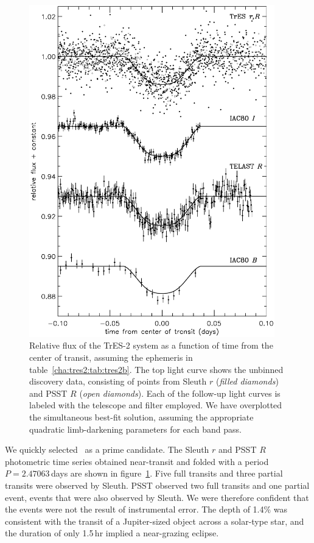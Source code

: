 \begin{figure}
\begin{center}
\includegraphics[width=0.95\textwidth]{4_f1}
\caption[Relative flux versus time for the TrES-2 transiting system]{Relative flux of the TrES-2 system as a function of time
  from the center of transit, assuming the ephemeris in
  table~\ref{cha:tres2:tab:tres2b}. The top light curve shows the unbinned
  discovery data, consisting of points from Sleuth $r$ ({\it filled
    diamonds}) and PSST $R$ ({\it open diamonds}). Each of the
  follow-up light curves is labeled with the telescope and filter
  employed.  We have overplotted the simultaneous best-fit solution,
  assuming the appropriate quadratic limb-darkening parameters for
  each band pass.}
\label{cha:tres2:fig:treslc}
\end{center}
\end{figure}

We quickly selected \tresTwo\ as a prime candidate. The Sleuth $r$ and
PSST $R$ photometric time series obtained near-transit and folded with
a period $P=2.47063$\,days are shown in figure~\ref{cha:tres2:fig:treslc}. Five
full transits and three partial transits were observed by Sleuth. PSST
observed two full transits and one partial event, events that were
also observed by Sleuth. We were therefore confident that the events
were not the result of instrumental error. The depth of 1.4\% was
consistent with the transit of a Jupiter-sized object across a
solar-type star, and the duration of only 1.5\,hr implied a
near-grazing eclipse.

